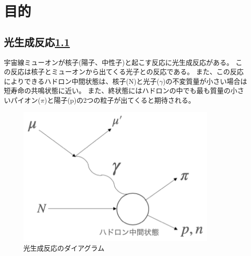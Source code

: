 \chapter{目的} \label{cha:introduction}

\section{光生成反応\ref{fig:test1}}

宇宙線ミューオンが核子(陽子、中性子)と起こす反応に光生成反応がある。
この反応は核子とミューオンから出てくる光子との反応である。
また、この反応によりできるハドロン中間状態は、核子(N)と光子($\gamma$)の不変質量が小さい場合は短寿命の共鳴状態に近い。
また、終状態にはハドロンの中でも最も質量の小さいパイオン($\pi$)と陽子(p)の2つの粒子が出てくると期待される。

\begin{figure}[H]
	\centering
	\includegraphics[width=10cm]{img/diagram_photoproduction.png}
	\caption{光生成反応のダイアグラム}
	\label{fig:test1}
\end{figure}